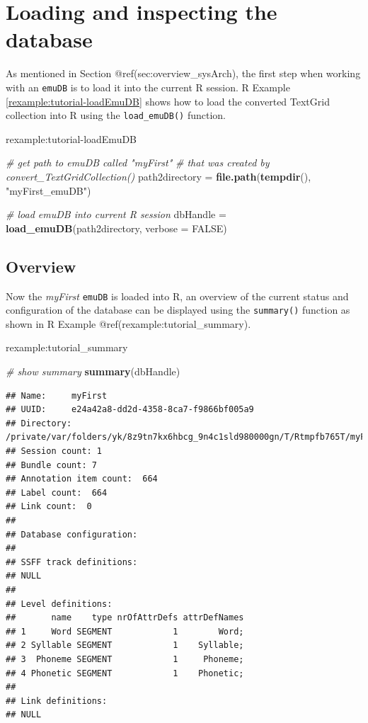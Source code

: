 \documentclass[]{book}
\newenvironment{Shaded}{\begin{snugshade}}{\end{snugshade}}
\newcommand{\CommentTok}[1]{\textcolor[rgb]{0.56,0.35,0.01}{\textit{#1}}}
\newcommand{\DataTypeTok}[1]{\textcolor[rgb]{0.13,0.29,0.53}{#1}}
\newcommand{\KeywordTok}[1]{\textcolor[rgb]{0.13,0.29,0.53}{\textbf{#1}}}
\newcommand{\NormalTok}[1]{#1}
\newcommand{\OtherTok}[1]{\textcolor[rgb]{0.56,0.35,0.01}{#1}}
\newcommand{\StringTok}[1]{\textcolor[rgb]{0.31,0.60,0.02}{#1}}
\theoremstyle{definition}
\theoremstyle{definition}
\theoremstyle{definition}
\theoremstyle{remark}
\begin{document}
\hypertarget{loading-and-inspecting-the-database}{%
\section{Loading and inspecting the
database}\label{loading-and-inspecting-the-database}}

As mentioned in Section @ref(sec:overview\_sysArch), the first step when
working with an \texttt{emuDB} is to load it into the current R session.
R Example \ref{rexample:tutorial-loadEmuDB} shows how to load the
converted TextGrid collection into R using the \texttt{load\_emuDB()}
function.

rexample:tutorial-loadEmuDB

\begin{Shaded}
\begin{Highlighting}[]
\CommentTok{# get path to emuDB called "myFirst"}
\CommentTok{# that was created by convert_TextGridCollection()}
\NormalTok{path2directory =}\StringTok{ }\KeywordTok{file.path}\NormalTok{(}\KeywordTok{tempdir}\NormalTok{(), }\StringTok{"myFirst_emuDB"}\NormalTok{)}

\CommentTok{# load emuDB into current R session}
\NormalTok{dbHandle =}\StringTok{ }\KeywordTok{load_emuDB}\NormalTok{(path2directory, }\DataTypeTok{verbose =} \OtherTok{FALSE}\NormalTok{)}
\end{Highlighting}
\end{Shaded}

\hypertarget{overview}{%
\subsection{Overview}\label{overview}}

Now the \emph{myFirst} \texttt{emuDB} is loaded into R, an overview of
the current status and configuration of the database can be displayed
using the \texttt{summary()} function as shown in R Example
@ref(rexample:tutorial\_summary).

rexample:tutorial\_summary

\begin{Shaded}
\begin{Highlighting}[]
\CommentTok{# show summary}
\KeywordTok{summary}\NormalTok{(dbHandle)}
\end{Highlighting}
\end{Shaded}

\begin{verbatim}
## Name:     myFirst 
## UUID:     e24a42a8-dd2d-4358-8ca7-f9866bf005a9 
## Directory:    /private/var/folders/yk/8z9tn7kx6hbcg_9n4c1sld980000gn/T/Rtmpfb765T/myFirst_emuDB 
## Session count: 1 
## Bundle count: 7 
## Annotation item count:  664 
## Label count:  664 
## Link count:  0 
## 
## Database configuration:
## 
## SSFF track definitions:
## NULL
## 
## Level definitions:
##       name    type nrOfAttrDefs attrDefNames
## 1     Word SEGMENT            1        Word;
## 2 Syllable SEGMENT            1    Syllable;
## 3  Phoneme SEGMENT            1     Phoneme;
## 4 Phonetic SEGMENT            1    Phonetic;
## 
## Link definitions:
## NULL
\end{verbatim}
\end{document}
